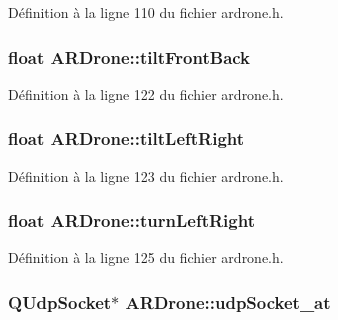 Définition à la ligne 110 du fichier ardrone.\-h.

\hypertarget{class_a_r_drone_a674129a2cb1f57f285fcb75b3ccfe196}{
\subsubsection[{tilt\-Front\-Back}]{\setlength{\rightskip}{0pt plus 5cm}float A\-R\-Drone\-::tilt\-Front\-Back\hspace{0.3cm}{\ttfamily [private]}}}\label{class_a_r_drone_a674129a2cb1f57f285fcb75b3ccfe196}


Définition à la ligne 122 du fichier ardrone.\-h.

\hypertarget{class_a_r_drone_ae9442e072e260cf4e216849561cedfe7}{
\subsubsection[{tilt\-Left\-Right}]{\setlength{\rightskip}{0pt plus 5cm}float A\-R\-Drone\-::tilt\-Left\-Right\hspace{0.3cm}{\ttfamily [private]}}}\label{class_a_r_drone_ae9442e072e260cf4e216849561cedfe7}


Définition à la ligne 123 du fichier ardrone.\-h.

\hypertarget{class_a_r_drone_a2e5ccfe94f6112399641f0cf0d97231e}{
\subsubsection[{turn\-Left\-Right}]{\setlength{\rightskip}{0pt plus 5cm}float A\-R\-Drone\-::turn\-Left\-Right\hspace{0.3cm}{\ttfamily [private]}}}\label{class_a_r_drone_a2e5ccfe94f6112399641f0cf0d97231e}


Définition à la ligne 125 du fichier ardrone.\-h.

\hypertarget{class_a_r_drone_ad782b7e11364e26df56385c91c77dca5}{
\subsubsection[{udp\-Socket\-\_\-at}]{\setlength{\rightskip}{0pt plus 5cm}Q\-Udp\-Socket$\ast$ A\-R\-Drone\-::udp\-Socket\-\_\-at\hspace{0.3cm}{\ttfamily [private]}}}\label{class_a_r_drone_ad782b7e11364e26df56385c91c77dca5}


